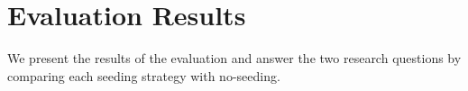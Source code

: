 
\section{Evaluation Results}
\label{sec:model_seeding:eval-results}



We present the results of the evaluation and answer the two research questions by comparing each seeding strategy with no-seeding.



%	




